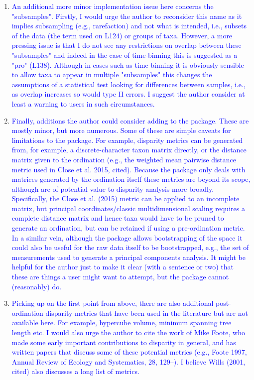 \documentclass[12pt,letterpaper]{article}
\begin{document}
\begin{enumerate}
\item{\textcolor{blue}{An additional more minor implementation issue here concerns the "subsamples". Firstly, I would urge the author to reconsider this name as it implies subsampling (e.g., rarefaction) and not what is intended, i.e., subsets of the data (the term used on L124) or groups of taxa. However, a more pressing issue is that I do not see any restrictions on overlap between these "subsamples" and indeed in the case of time-binning this is suggested as a "pro" (L138). Although in cases such as time-binning it is obviously sensible to allow taxa to appear in multiple "subsamples" this changes the assumptions of a statistical test looking for differences between samples, i.e., as overlap increases so would type II errors. I suggest the author consider at least a warning to users in such circumstances.}}


\item{\textcolor{blue}{Finally, additions the author could consider adding to the package. These are mostly minor, but more numerous. Some of these are simple caveats for limitations to the package. For example, disparity metrics can be generated from, for example, a discrete-character taxon matrix directly, or the distance matrix given to the ordination (e.g., the weighted mean pairwise distance metric used in Close et al. 2015, cited). Because the package only deals with matrices generated by the ordination itself these metrics are beyond its scope, although are of potential value to disparity analysis more broadly. Specifically, the Close et al. (2015) metric can be applied to an incomplete matrix, but principal coordinates/classic multidimensional scaling requires a complete distance matrix and hence taxa would have to be pruned to generate an ordination, but can be retained if using a pre-ordination metric. In a similar vein, although the package allows bootstrapping of the space it could also be useful for the raw data itself to be bootstrapped, e.g., the set of measurements used to generate a principal components analysis. It might be helpful for the author just to make it clear (with a sentence or two) that these are things a user might want to attempt, but the package cannot (reasonably) do.}}


\item{\textcolor{blue}{Picking up on the first point from above, there are also additional post-ordination disparity metrics that have been used in the literature but are not available here. For example, hypercube volume, minimum spanning tree length etc. I would also urge the author to cite the work of Mike Foote, who made some early important contributions to disparity in general, and has written papers that discuss some of these potential metrics (e.g., Foote 1997, Annual Review of Ecology and Systematics, 28, 129–). I believe Wills (2001, cited) also discusses a long list of metrics.}}


\end{enumerate}
\end{document}
